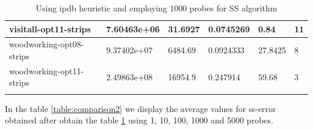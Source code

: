 \documentclass[11pt,a4paper,oneside]{report}
\begin{document}
\begin{longtable}{@{\extracolsep{\fill}} llllll @{}}
visitall-opt11-strips    & 7.60463e+06 & 31.6927   & 0.0745269   & 0.84     & 11 \\ \hline
woodworking-opt08-strips & 9.37402e+07 & 6484.69   & 0.0924333   & 27.8425  & 8  \\ \hline
woodworking-opt11-strips & 2.49863e+08 & 16954.9   & 0.247914    & 59.68    & 3  \\ \hline
\caption{Using ipdb heuristic and employing 1000 probes for SS algorithm}
\label{table:comparison1}
\end{longtable}

In the table \ref{table:comparison2} we display the average values for ss-error obtained after obtain the table \ref{table:comparison1} using 1, 10, 100, 1000 and 5000 probes.
\end{document}
